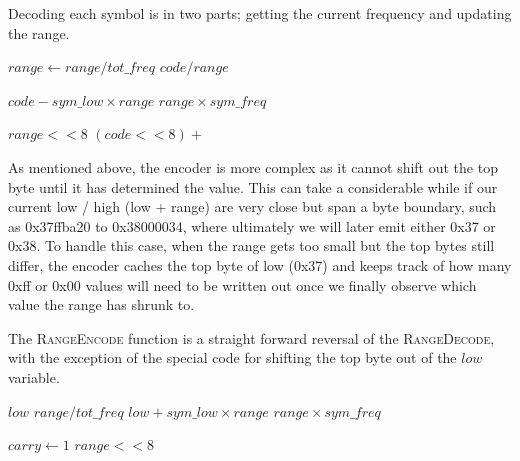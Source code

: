 \documentclass[a4paper]{article}
\begin{document}
Decoding each symbol is in two parts; getting the current frequency and updating the range.

\begin{algorithmic}[1]
  \State $range \gets range / tot\_freq$
  \State \Return $code / range$
\EndFunction
\end{algorithmic}

\begin{algorithmic}[1]
  \settowidth{\maxwidth}{range\ }
  \State {} $code - sym\_low \times range$
  \State {} $range \times sym\_freq$

   
    \settowidth{\maxwidth}{range\ }
    \State {} $range << 8$
    \State {} $(code<<8) + $
  \EndWhile
\EndProcedure
\end{algorithmic}

As mentioned above, the encoder is more complex as it cannot shift out the top byte until it has determined the value.
This can take a considerable while if our current low / high (low + range) are very close but span a byte boundary, such as 0x37ffba20 to 0x38000034, where ultimately we will later emit either 0x37 or 0x38.
To handle this case, when the range gets too small but the top bytes still differ, the encoder caches the top byte of low (0x37) and keeps track of how many 0xff or 0x00 values will need to be written out once we finally observe which value the range has shrunk to.

The \textsc{RangeEncode} function is a straight forward reversal of the \textsc{RangeDecode}, with the exception of the special code for shifting the top byte out of the $low$ variable.

\begin{algorithmic}[1]
  \settowidth{\maxwidth}{old\_low\ }
  \State {} $low$
  \State {} $range / tot\_freq$
  \State {} $low + sym\_low \times range$
  \State {} $range \times sym\_freq$

  \Statex
    \State $carry \gets 1$ 
  \EndIf
   
    \settowidth{\maxwidth}{range\ }
    \State {} $range << 8$
    \State {}
  \EndWhile
\EndProcedure
\end{algorithmic}
\end{document}
